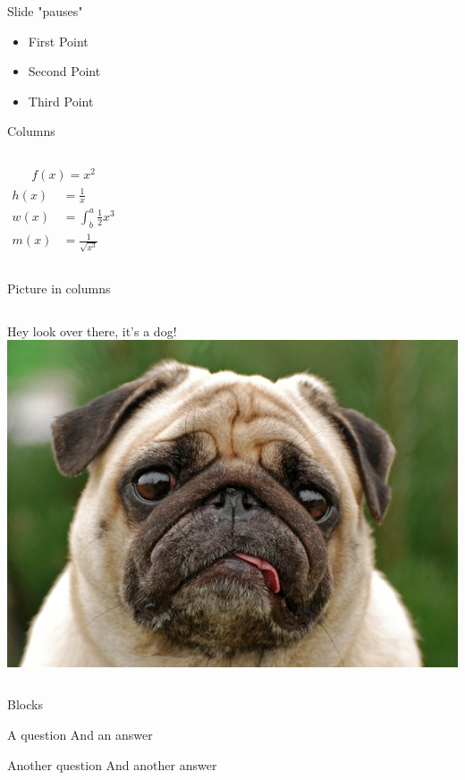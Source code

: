 \documentclass{beamer}
\begin{document}
    \begin{frame}{Slide "pauses"}
        \begin{itemize}
            \item First Point
                \pause
            \item Second Point
                \pause
            \item Third Point
        \end{itemize}
    \end{frame}
    
    \begin{frame}{Columns}
        \begin{columns}
            \begin{align*}
                f(x) = x^2
            \end{align*}
            \begin{align*}
                h(x) &= \frac{1}{x} \\
                w(x) &= \int^a_b \frac{1}{2}x^3 \\
                m(x) &= \frac{1}{\sqrt{x^3}}
            \end{align*}
        \end{columns}
    \end{frame}
    
    \begin{frame}{Picture in columns}
        \begin{columns}
            \centering
            Hey look over there, it's a dog!
            \centering
            \includegraphics[scale=0.3]{pug.png}
        \end{columns}
    \end{frame}
    
    \begin{frame}{Blocks}
        \begin{block}{A question}
            And an answer
        \end{block}
        \begin{block}{Another question}
            And another answer
        \end{block}
    \end{frame}
    
\end{document}
